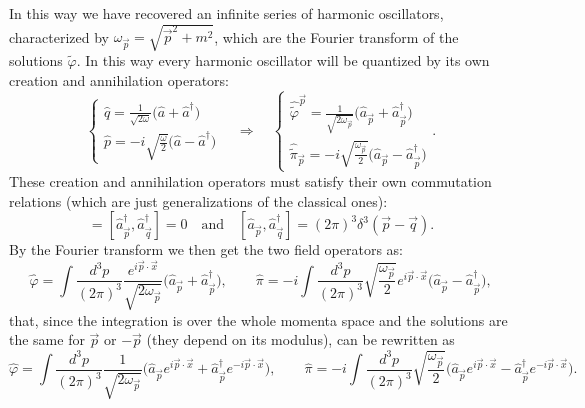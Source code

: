 In this way we have recovered an infinite series of harmonic oscillators, characterized by $\omega_{\vec{p}}=\sqrt{\vec p^2+m^2}$, which are the Fourier transform of the solutions $\tilde\varphi$. In this way every harmonic oscillator will be quantized by its own creation and annihilation operators:
\begin{equation*}
    \begin{cases}
        \hat q=\frac{1}{\sqrt{2\omega}}\big(\hat{a}+\hat{a}^\dagger\big)\\
        \hat p=-i\sqrt{\frac{\omega}{2}}\big(\hat{a}-\hat{a}^\dagger\big)
    \end{cases}\quad\Rightarrow\quad
    \begin{cases}
        \hat{\tilde{\varphi}}^{\vec{p}}=\frac{1}{\sqrt{2\omega_{\vec{p}}}}\big(\hat{a}_{\vec{p}}+\hat{a}_{\vec{p}}^\dagger\big)\\
        \hat{\tilde{\pi}}_{\vec{p}}=-i\sqrt{\frac{\omega_{\vec{p}}}{2}}\big(\hat{a}_{\vec{p}}-\hat{a}_{\vec{p}}^\dagger\big)
    \end{cases}.
\end{equation*}
These creation and annihilation operators must satisfy their own commutation relations (which are just generalizations of the classical ones):
\begin{equation*}
    [\hat{a}_{\vec{p}},\hat{a}_{\vec{q}}]=[\hat{a}^{\dagger}_{\vec{p}},\hat{a}_{\vec{q}}^{\dagger}]=0\quad \text{and}\quad [\hat{a}_{\vec{p}},\hat{a}_{\vec{q}}^{\dagger}]=(2\pi)^3\delta^3(\vec p-\vec q).
\end{equation*}
By the Fourier transform we then get the two field operators as:
\begin{equation*}
        \hat{\varphi}=\int\frac{d^3p}{(2\pi)^3}\frac{e^{i\vec p\cdot \vec x}}{\sqrt{2\omega_{\vec{p}}}}\big(\hat{a}_{\vec{p}}+\hat{a}_{\vec{p}}^\dagger\big),\qquad
        \hat{\pi}=-i\int\frac{d^3p}{(2\pi)^3}\sqrt{\frac{\omega_{\vec{p}}}{2}}e^{i\vec p\cdot \vec x}\big(\hat{a}_{\vec{p}}-\hat{a}_{\vec{p}}^\dagger\big),
\end{equation*}
that, since the integration is over the whole momenta space and the solutions are the same for $\vec p$ or $-\vec p$ (they depend on its modulus), can be rewritten as
\begin{equation}\label{KGFieldOperators}
    \hat{\varphi}=\int\frac{d^3p}{(2\pi)^3}\frac{1}{\sqrt{2\omega_{\vec{p}}}}\bigg(\hat{a}_{\vec{p}}e^{i\vec p\cdot \vec x}+\hat{a}_{\vec{p}}^\dagger e^{-i\vec p\cdot \vec x}\bigg),\qquad
    \hat{\pi}=-i\int\frac{d^3p}{(2\pi)^3}\sqrt{\frac{\omega_{\vec{p}}}{2}}\bigg(\hat{a}_{\vec{p}}e^{i\vec p\cdot \vec x}-\hat{a}_{\vec{p}}^\dagger e^{-i\vec p\cdot \vec x}\bigg).
\end{equation}
